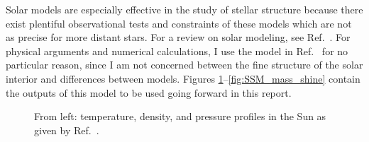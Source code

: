 \documentclass[12pt]{article}
\begin{document}
Solar models are especially effective in the study of stellar structure because there exist plentiful observational tests and constraints of these models which are not as precise for more distant stars. For a review on solar modeling, see Ref.~\cite{Serenelli_2016}. For physical arguments and numerical calculations, I use the model in Ref.~\cite{Bahcall_2005} for no particular reason, since I am not concerned between the fine structure of the solar interior and differences between models. Figures \ref{fig:SSM_state_vars}--\ref{fig:SSM_mass_shine} contain the outputs of this model to be used going forward in this report.

\begin{figure}[H]
    \centering
    \caption{From left: temperature, density, and pressure profiles in the Sun as given by Ref.~\cite{Bahcall_2005}.}
    \label{fig:SSM_state_vars}
\end{figure}
\end{document}
